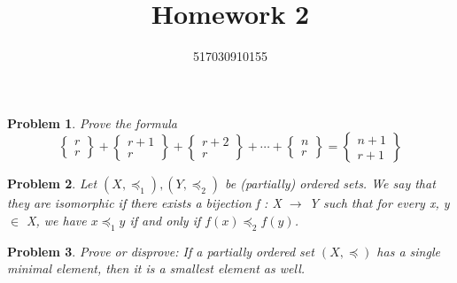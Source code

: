 \documentclass[12pt,a4paper]{article}
\title{{\textbf{Homework 2}}\vspace{1mm}}
\author{}
\date{517030910155}
\makeatletter
\newtheorem{problem}{Problem}
\newtheorem*{solution}{Solution}
\theoremstyle{definition}
\renewenvironment{solution}[1][Solution] {\par\pushQED{\qed}\normalfont\topsep6\p@\@plus6\p@\relax\trivlist\item[\hskip\labelsep\bfseries#1\@addpunct{.}]\ignorespaces}{\popQED\endtrivlist\@endpefalse} \makeatother
\makeatother
\begin{document}
\noindent


\maketitle

\begin{enumerate}
\begin{problem}
Prove the formula
$$
 \left\{
 \begin{matrix}
   r  \\
   r  
  \end{matrix}
  \right\} \tag{2}+
  \left\{
 \begin{matrix}
   r+1  \\
   r  
  \end{matrix}
  \right\} \tag{2}+
  \left\{
 \begin{matrix}
   r+2  \\
   r  
  \end{matrix}
  \right\} \tag{2}+
  \cdots +
  \left\{
 \begin{matrix}
   n  \\
   r  
  \end{matrix}
  \right\} \tag{2}=
  \left\{
 \begin{matrix}
   n+1  \\
   r+1  
  \end{matrix}
  \right\} \tag{2}
$$
\begin{solution}
\renewcommand{\qedsymbol}{}


\end{solution}
\end{problem}
\item
\begin{problem}
Let $(X, \preccurlyeq_1), (Y, \preccurlyeq_2)$ be (partially) ordered sets. We say that they are isomorphic if there exists a bijection f : X $\rightarrow$ Y such that for every x, y $\in$ X, we have $x \preccurlyeq_1 y$ if and only if
$f(x) \preccurlyeq_2 f(y)$.

\begin{solution}
\item
\renewcommand{\qedsymbol}{}

\end{solution}
\end{problem}
\par
\begin{problem}
Prove or disprove: If a partially ordered set $(X, \preccurlyeq)$ has a single minimal element, then it is a smallest element as well.
\begin{solution}\item
\renewcommand{\qedsymbol}{}


\end{solution}
\end{problem}
\end{enumerate}
\end{document}

